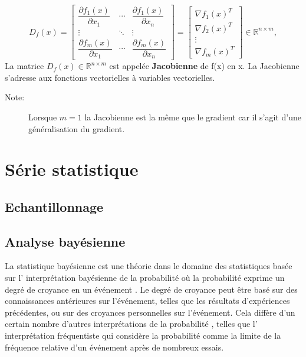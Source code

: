	$$
	D_f\left(x\right)={
	\begin{bmatrix}
	{\dfrac {\partial f_{1}(x)}{\partial x_{1}}}&\cdots &{\dfrac {\partial f_{1}(x)}{\partial x_{n}}}\\
	\vdots &\ddots &\vdots \\
	{\dfrac {\partial f_{m}(x)}{\partial x_{1}}}&\cdots &{\dfrac {\partial f_{m}(x)}{\partial x_{n}}}
	\end{bmatrix}}
	=
	\begin{bmatrix}
	\nabla f_1(x)^T \\ \nabla f_2(x)^T\\ \vdots \\ \nabla f_m(x)^T
	\end{bmatrix}
	\in  \mathbb{R}^{n \times m},
	$$
	La matrice $D_f (x) \in  \mathbb{R}^{n \times m} $ est appelée \textbf{Jacobienne} de f(x) en x.
	La Jacobienne s’adresse aux fonctions vectorielles à variables vectorielles.
	
	
	
	
	
	\begin{description}
	\item[Note:] Lorsque $m=1$ la Jacobienne est la même que le gradient car il s'agit d'une généralisation du gradient.
	\end{description}




\section{Série statistique}
	\lipsum[1]
	\subsection{Echantillonnage}
	\lipsum[1]

	\subsection{Analyse bayésienne}
	La statistique bayésienne est une théorie dans le domaine des statistiques basée sur l' interprétation bayésienne de la probabilité où la probabilité exprime un degré de croyance en un événement . Le degré de croyance peut être basé sur des connaissances antérieures sur l'événement, telles que les résultats d'expériences précédentes, ou sur des croyances personnelles sur l'événement. Cela diffère d'un certain nombre d'autres interprétations de la probabilité , telles que l' interprétation fréquentiste qui considère la probabilité comme la limite de la fréquence relative d'un événement après de nombreux essais.
	
